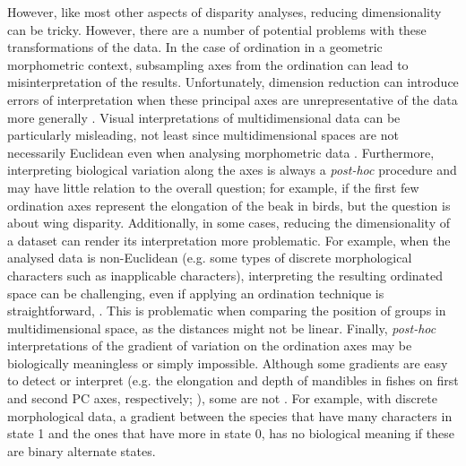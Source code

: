 \documentclass[12pt,letterpaper]{article}
\begin{document}
However, like most other aspects of disparity analyses, reducing dimensionality can be tricky.
However, there are a number of potential problems with these transformations of the data.
In the case of ordination in a geometric morphometric context, subsampling axes from the ordination can lead to misinterpretation of the results. %
Unfortunately, dimension reduction can introduce errors of interpretation when these principal axes are unrepresentative of the data more generally \citep{Bookstein1997-dn, Bookstein2015-yy, Bookstein2017-qk, Bookstein2017-gu,Weisbecker2019-kp}.
Visual interpretations of multidimensional data can be particularly misleading, not least since multidimensional spaces are not necessarily Euclidean even when analysing morphometric data \citep{Deline2018-le, Gerber2017-xi}.
Furthermore, interpreting biological variation along the axes is always a \textit{post-hoc} procedure and may have little relation to the overall question; for example, if the first few ordination axes represent the elongation of the beak in birds, but the question is about wing disparity.
Additionally, in some cases, reducing the dimensionality of a dataset can render its interpretation more problematic.
For example, when the analysed data is non-Euclidean (e.g. some types of discrete morphological characters such as inapplicable characters), interpreting the resulting ordinated space can be challenging, even if applying an ordination technique is straightforward, \citep{Gerber2017-xi}. %
This is problematic when comparing the position of groups in multidimensional space, as the distances might not be linear.
Finally, \textit{post-hoc} interpretations of the gradient of variation on the ordination axes may be biologically meaningless or simply impossible. %
Although some gradients are easy to detect or interpret (e.g. the elongation and depth of mandibles in fishes on first and second PC axes, respectively; \citealt{Hill2018-ye}), some are not \citep[][e.g.]{Weisbecker2019-kp}.
For example, with discrete morphological data, a gradient between the species that have many characters in state 1 and the ones that have more in state 0, has no biological meaning if these are binary alternate states.
\end{document}
